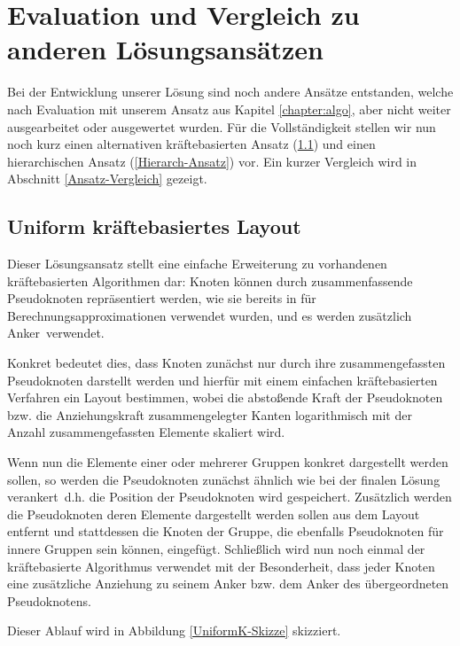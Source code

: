 \chapter{Evaluation und Vergleich zu anderen Lösungsansätzen}
\label{chapter:vgl}

Bei der Entwicklung unserer Lösung sind noch andere Ansätze entstanden, welche nach Evaluation mit unserem Ansatz aus Kapitel \ref{chapter:algo}, aber nicht weiter ausgearbeitet oder ausgewertet wurden. Für die Vollständigkeit stellen wir nun noch kurz einen alternativen kräftebasierten Ansatz (\ref{UniformK-Ansatz}) und einen hierarchischen Ansatz (\ref{Hierarch-Ansatz}) vor. Ein kurzer Vergleich wird in Abschnitt \ref{Ansatz-Vergleich} gezeigt.

\section{Uniform kräftebasiertes Layout}
\label{UniformK-Ansatz}
Dieser Lösungsansatz stellt eine einfache Erweiterung zu vorhandenen kräftebasierten Algorithmen dar: Knoten können durch zusammenfassende Pseudoknoten repräsentiert werden, wie sie bereits in \cite{gdea_3362} für Berechnungsapproximationen verwendet wurden, und es werden zusätzlich \glqq Anker\grqq\ verwendet.

Konkret bedeutet dies, dass Knoten zunächst nur durch ihre zusammengefassten Pseudoknoten darstellt werden und hierfür mit einem einfachen kräftebasierten Verfahren ein Layout bestimmen, wobei die abstoßende Kraft der Pseudoknoten bzw. die Anziehungskraft zusammengelegter Kanten logarithmisch mit der Anzahl zusammengefassten Elemente skaliert wird.

Wenn nun die Elemente einer oder mehrerer Gruppen konkret dargestellt werden sollen, so werden die Pseudoknoten zunächst ähnlich wie bei der finalen Lösung \glqq verankert\grqq\, d.h. die Position der Pseudoknoten wird gespeichert. Zusätzlich werden die Pseudoknoten deren Elemente dargestellt werden sollen aus dem Layout entfernt und stattdessen die Knoten der Gruppe, die ebenfalls Pseudoknoten für innere Gruppen sein können, eingefügt. Schließlich wird nun noch einmal der kräftebasierte Algorithmus verwendet mit der Besonderheit, dass jeder Knoten eine zusätzliche Anziehung zu seinem Anker bzw. dem Anker des übergeordneten Pseudoknotens.

Dieser Ablauf wird in Abbildung \ref{UniformK-Skizze} skizziert.

